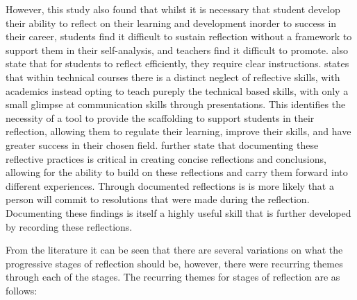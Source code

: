 \documentclass{l4proj}
\begin{document}
However, this study also found that whilst it is necessary that student develop their ability to reflect on their learning and development inorder
to success in their career, students find it difficult to sustain reflection without a framework to support them in their self-analysis, and teachers
find it difficult to promote. \citet{bruno_reflective_2018} also state that for students to reflect efficiently, they require clear instructions. 
\citet{thurner_development_2020} states that within technical courses there is a distinct neglect of reflective skills,
with academics instead opting to teach pureply the technical based skills, with only a small glimpse at communication skills through presentations.
This identifies the necessity of a tool to provide the scaffolding to support students in their reflection, allowing
them to regulate their learning, improve their skills, and have greater success in their chosen field. \citet{thurner_development_2020} further state
that documenting these reflective practices is critical in creating concise reflections and conclusions, allowing for the ability to build on these 
reflections and carry them forward into different experiences. Through documented reflections is is more likely that a person will commit to resolutions
that were made during the reflection. Documenting these findings is itself a highly useful skill that is further developed by recording these reflections.


From the literature it can be seen that there are several variations on what the progressive stages of reflection should be, however, there were recurring 
themes through each of the stages. The recurring themes for stages of reflection are as follows:
\end{document}
